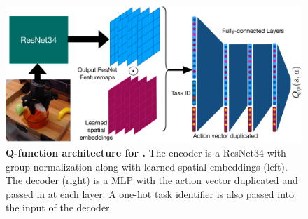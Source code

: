 \begin{figure}
\vspace{-0.5cm}
    \centering
    \setcounter{figure}{1}
  \includegraphics[width=0.85\linewidth]{chapters/ptr/architecture.pdf}
  \caption{\footnotesize{\textbf{Q-function architecture for \ptrmethodname.} The encoder is a ResNet34 with group normalization along with learned spatial embeddings (left). The decoder (right) is a MLP with the action vector duplicated and passed in at each layer. A one-hot task identifier is also passed into the input of the decoder.}}
  \vspace{-0.1cm}
  \label{fig:arch}
\end{figure}

~

~


